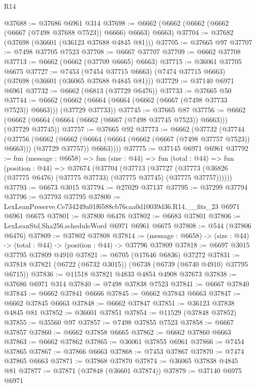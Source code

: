\begin{lexlean}{R14}
\begin{coremodule}
@37688 := @37686 @6961 @314
@37698 := @6662 (@6662 (@6662 (@6662 (@6667 (@7498 @37688 @7523)) @6666) @6663) @6663)
@37704 := @37682 (@37698 (@36601 (@36123 @37688 @4845 @81)))
@37705 := @37665 @97
@37707 := @7498 @37705 @7523
@37708 := @6667 @37707
@37709 := @6662 @37708
@37713 := @6662 (@6662 (@37709 @6665) @6663)
@37715 := @36061 @37705 @6675
@37727 := @7453
    (@7454 @37715 @6663)
    (@7474 @37715 @6663)
    (@37698 (@36601 (@36065 @37688 @4845 @81)))
@37729 := @37140 @6971 @6961
@37732 := @6662 (@6813 (@37729 @6476))
@37733 := @37665 @50
@37744 := @6662 (@6662 (@6664 (@6664 (@6662 (@6667 (@7498 @37733 @7523)) @6663))) (@37729 @37733))
@37745 := @37665 @87
@37756 := @6662 (@6662 (@6664 (@6664 (@6662 (@6667 (@7498 @37745 @7523)) @6663))) (@37729 @37745))
@37757 := @37665 @92
@37773 := @6662
    (@37732
      (@37744
        (@37756
          (@6662
            (@6662 (@6664 (@6664 (@6662 (@6667 (@7498 @37757 @7523)) @6663))) (@37729 @37757))
            @6663))))
@37775 := @37145 @6971 @6961
@37792 := fun (message : @6658) =>
  fun (size : @44) =>
  fun (total : @44) =>
  fun (position : @44) =>
  @37674
    (@37704
      (@37713
        (@37727 (@37773 (@36826 (@37775 @6476) (@37775 @37733) (@37775 @37745) (@37775 @37757))))))
@37793 := @6673 @3015
@37794 := @27029 @37137
@37795 := @37299 @37794
@37796 := @37793 @37795
@37800 := LexLeanPreserve.Ce734249a01f6588cb76caa0d10039d36.R14.__fits_23 @6971 @6961 @6675
@37801 := @37800 @6476
@37802 := @6683 @37801
@37806 := LexLeanStd.Sha256.scheduleWord @6971 @6961 @6675
@37808 := @544 (@37806 @6476)
@37809 := @37802 @37808
@37814 := (message : @6658) -> (size : @44) -> (total : @44) -> (position : @44) -> @37796 @37809
@37818 := @6697 @3015 @37795 @37809 @4910
@37821 := @6705 (@17646 @6836) @37272
@37831 := @37818 @37821 (@6722 (@6732 @3015)) (@6738 (@6739 (@6740 @4910) @37795 @6715))
@37836 := @11518 @37821 @4833 @4854 @4908 @37673
@37838 := @37686 @6971 @314
@37840 := @7498 @37838 @7523
@37841 := @6667 @37840
@37843 := @6662 @37841 @6666
@37845 := @6662 @37843 @6663
@37847 := @6662 @37845 @6663
@37848 := @6662 @37847
@37851 := @36123 @37838 @4845 @81
@37852 := @36601 @37851
@37854 := @11529 (@37848 @37852)
@37855 := @35560 @97
@37857 := @7498 @37855 @7523
@37858 := @6667 @37857
@37860 := @6662 @37858 @6665
@37862 := @6662 @37860 @6663
@37863 := @6662 @37862
@37865 := @36061 @37855 @6961
@37866 := @7454 @37865
@37867 := @37866 @6663
@37868 := @7453 @37867
@37870 := @7474 @37865 @6663
@37871 := @37868 @37870
@37874 := @36065 @37838 @4845 @81
@37877 := @37871 (@37848 (@36601 @37874))
@37879 := @37140 @6975 @6971

\end{coremodule}
\end{lexlean}
